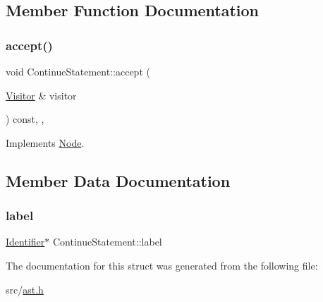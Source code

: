 \subsection{Member Function Documentation}
\mbox{\label{struct_continue_statement_a9288fc77078160a2709a6329f1fe4838}} 
\subsubsection{\texorpdfstring{accept()}{accept()}}
{\footnotesize\ttfamily void Continue\+Statement\+::accept (\begin{DoxyParamCaption}\item[{\hyperlink{struct_visitor}{Visitor} \&}]{visitor }\end{DoxyParamCaption}) const\hspace{0.3cm}{\ttfamily [inline]}, {\ttfamily [override]}, {\ttfamily [virtual]}}



Implements \hyperlink{struct_node_a10bd7af968140bbf5fa461298a969c71}{Node}.



\subsection{Member Data Documentation}
\mbox{\label{struct_continue_statement_a4bf8883a88736fa6ce4341e9029db194}} 
\subsubsection{\texorpdfstring{label}{label}}
{\footnotesize\ttfamily \hyperlink{struct_identifier}{Identifier}$\ast$ Continue\+Statement\+::label}



The documentation for this struct was generated from the following file\+:\begin{DoxyCompactItemize}
\item 
src/\hyperlink{ast_8h}{ast.\+h}\end{DoxyCompactItemize}
